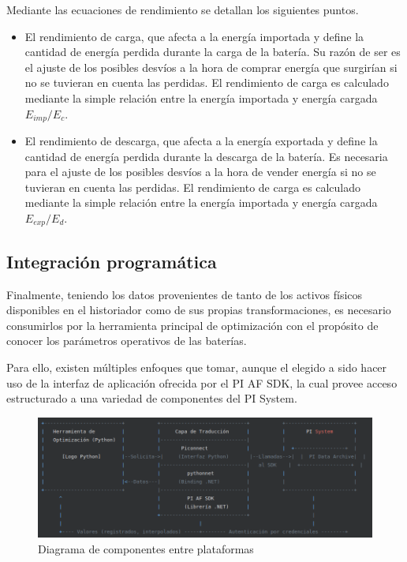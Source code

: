 Mediante las ecuaciones de rendimiento se detallan los siguientes puntos.

\begin{itemize}

\item El rendimiento de carga, que afecta a la energía importada y define la cantidad de energía perdida durante la carga de la batería. Su razón de ser es el ajuste de los posibles desvíos a la hora de comprar energía que surgirían si no se tuvieran en cuenta las perdidas. El rendimiento de carga es calculado mediante la simple relación entre la energía importada y energía cargada \(E_{imp} / E_c\).
      
\item El rendimiento de descarga, que afecta a la energía exportada y define la cantidad de energía perdida durante la descarga de la batería. Es necesaria para el ajuste de los posibles desvíos a la hora de vender energía si no se tuvieran en cuenta las perdidas. El rendimiento de carga es calculado mediante la simple relación entre la energía importada y energía cargada \(E_{exp} / E_d\).

\end{itemize}

\subsection{Integración programática}
\label{makereference3.5.2}

Finalmente, teniendo los datos provenientes de tanto de los activos físicos disponibles en el historiador como de sus propias transformaciones, es necesario consumirlos por la herramienta principal de optimización con el propósito de conocer los parámetros operativos de las baterías.

Para ello, existen múltiples enfoques que tomar, aunque el elegido a sido hacer uso de la interfaz de aplicación ofrecida por el PI AF SDK, la cual provee acceso estructurado a una variedad de componentes del PI System.

\begin{figure}
\centering
\includegraphics[width=0.5\linewidth]{figures/integración-programática.png}
\caption{Diagrama de componentes entre plataformas}
\label{fig:integración-programática}
\end{figure}

